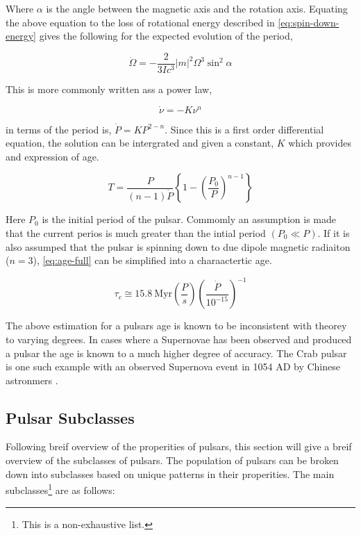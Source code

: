 Where $\alpha$ is the angle between the magnetic axis and the rotation axis. Equating the above equation to the loss of rotational energy described in \cref{eq:spin-down-energy} gives the following for the expected evolution of the period, 

\begin{equation}
    \dot \Omega = - \frac{2}{3Ic^3} |m|^2 \Omega^3 \sin^2 \alpha
\end{equation}

This is more commonly written ass a power law, 

\begin{equation}
    \dot \nu = -K \nu^n 
    \label{eq:spin-down-power-law}
\end{equation}

 in terms of the period is, $\dot P = K P^{2-n}$. Since this is a first order differential equation, the solution can be intergrated and given a constant, $K$ which provides and expression of age. 

\begin{equation}
    T = \frac{P}{(n-1)\dot P} \left\{ 1 - \left( \frac{P_0}{P} \right)^{n - 1} \right\} 
    \label{eq:age-full}
\end{equation}

Here $P_0$ is the initial period of the pulsar. Commomly an assumption is made that the current perios is much greater than the intial period $(P_0 \ll P)$. If it is also assumped that the pulsar is spinning down to due dipole magnetic radiaiton ($n=3$), \cref{eq:age-full} can be simplified into a charaactertic age. 

\begin{equation}
    \tau_c \cong 15.8~\text{Myr} \left( \frac{P}{s} \right) \left( \frac{\dot P}{10^{-15}} \right)^{-1}
\end{equation}

The above estimation for a pulsars age is known to be inconsistent with theorey to varying degrees. In cases where a Supernovae has been observed and produced a pulsar the age is known to a much higher degree of accuracy. The Crab pulsar is one such example with an observed Supernova event in 1054 AD by Chinese astronmers \citep{kaspi_chandra_2001}. %

\subsection{Pulsar Subclasses}
Following breif overview of the properities of pulsars, this section will give a breif overview of the subclasses of pulsars. The population of pulsars can be broken down into subclasses based on unique patterns in their properities. The main subclasses\footnote{This is a non-exhaustive list.} are as follows:

